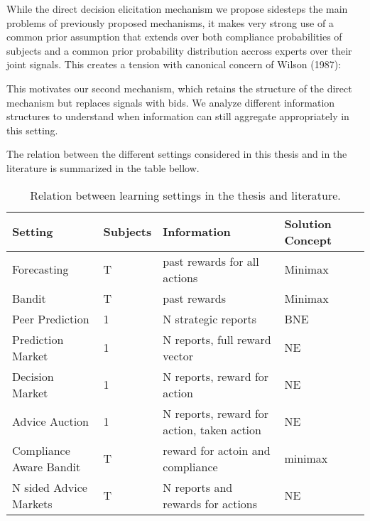 While the direct decision elicitation mechanism we propose sidesteps the main problems of previously proposed mechanisms, it makes very strong use of a common prior assumption that extends over both compliance probabilities of subjects and a common prior probability distribution accross experts over their joint signals. This creates a tension with canonical concern of Wilson (1987):


This motivates our second mechanism, which retains the structure of the direct mechanism but replaces signals with bids. We analyze different information structures to understand when information can still aggregate appropriately in this setting.

The relation between the different settings considered in this thesis and in the literature is summarized in the table bellow.

\begin{table}
	\begin{tabular}{lllll}
		\toprule
		Setting & Subjects & Information & Solution Concept\\
		\midrule
		Forecasting & T  & past rewards for all actions & Minimax  \\
		Bandit & T  & past rewards &  Minimax  \\
		Peer Prediction & 1 & N strategic reports & BNE \\
		Prediction Market & 1 & N reports, full reward vector &  NE\\
		Decision Market & 1 & N reports, reward for action & NE  \\
		Advice Auction  & 1 & N reports, reward for action, taken action & NE  \\
		Compliance Aware Bandit & T  & reward for actoin and compliance & minimax \\
		N sided Advice Markets  & T  &  N  reports and rewards for actions & NE  \\
		\bottomrule
	\end{tabular}
	\caption{Relation between learning settings in the thesis and literature.}
\end{table}


